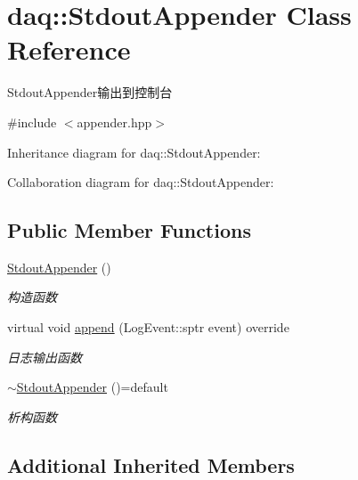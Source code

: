 \hypertarget{classdaq_1_1StdoutAppender}{}\section{daq\+:\+:Stdout\+Appender Class Reference}
\label{classdaq_1_1StdoutAppender}


Stdout\+Appender输出到控制台  




{\ttfamily \#include $<$appender.\+hpp$>$}



Inheritance diagram for daq\+:\+:Stdout\+Appender\+:


Collaboration diagram for daq\+:\+:Stdout\+Appender\+:
\subsection*{Public Member Functions}
\begin{DoxyCompactItemize}
\item 
\mbox{\label{classdaq_1_1StdoutAppender_a1f34afd0373582b20343f3d7b2f54f07}} 
\hyperlink{classdaq_1_1StdoutAppender_a1f34afd0373582b20343f3d7b2f54f07}{Stdout\+Appender} ()
\begin{DoxyCompactList}\small\item\em 构造函数 \end{DoxyCompactList}\item 
virtual void \hyperlink{classdaq_1_1StdoutAppender_ad51f98e464de89c07e5fe30a817f45d2}{append} (Log\+Event\+::sptr event) override
\begin{DoxyCompactList}\small\item\em 日志输出函数 \end{DoxyCompactList}\item 
\mbox{\label{classdaq_1_1StdoutAppender_abc6c504b1b780c96b4c90898936c2c6e}} 
\hyperlink{classdaq_1_1StdoutAppender_abc6c504b1b780c96b4c90898936c2c6e}{$\sim$\+Stdout\+Appender} ()=default
\begin{DoxyCompactList}\small\item\em 析构函数 \end{DoxyCompactList}\end{DoxyCompactItemize}
\subsection*{Additional Inherited Members}


